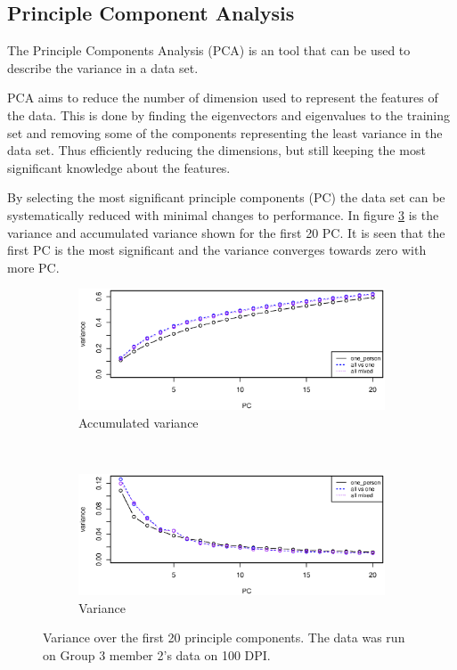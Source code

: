 \subsection{Principle Component Analysis}
The Principle Components Analysis (PCA) is an tool that can be used to describe the variance in a data set.

PCA aims to reduce the number of dimension used to represent the features of the data.
This is done by finding the eigenvectors and eigenvalues to the training set and removing some of the components representing the least variance in the data set.
Thus efficiently reducing the dimensions, but still keeping the most significant knowledge about the features.

By selecting the most significant principle components (PC) the data set can be systematically reduced with minimal changes to performance.
In figure \ref{fig:variance} is the variance and accumulated variance shown for the first 20 PC. 
It is seen that the first PC is the most significant and the variance converges towards zero with more PC.

\begin{figure}[H]
\centering
\begin{subfigure}{0.70\textwidth}
\centering
\includegraphics[width=\textwidth]{graphics/pca_acc_variance}
\caption{Accumulated variance}
\label{fig:pca_accumulated_var}
\end{subfigure}\\[-1cm]
\begin{subfigure}{0.70\textwidth}
\centering
\includegraphics[width=\textwidth]{graphics/pca_variance}
\caption{Variance}
\label{fig:pca_accumulated_var}
\end{subfigure}
\caption[PCA variance]{Variance over the first 20 principle components.
The data was run on Group 3 member 2's data on 100 DPI. }
\label{fig:variance}
\end{figure}


